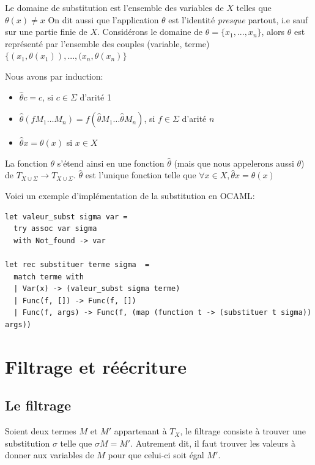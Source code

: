 \documentclass[11pt]{book}
\begin{document}
Le domaine de substitution est l'ensemble des variables de $X$ telles que $\theta (x) \neq x$
On dit aussi que l'application $\theta$ est l'identité \textit{presque} partout, i.e sauf sur une partie finie
de $X$.
Considérons le domaine de $\theta = \{x_1, ..., x_n\}$, alors $\theta$ est représenté par l'ensemble
des couples (variable, terme) $\{(x_1, \theta (x_1)), ...,(x_n, \theta (x_n) \} $

Nous avons par induction:
\begin{itemize}
	\item $\hat{\theta} c = c$, si $c \in \Sigma$ d'arité 1
	\item $\hat{\theta} (f M_1 \dots M_n) = f(\hat{\theta} M_1 \dots \hat{\theta} M_n )$, si $f \in \Sigma$ d'arité $n$ 
	\item $\hat{\theta} x = \theta (x)$ si $x \in X$
\end{itemize}
La fonction  $\theta$ s'étend ainsi en une fonction $\hat{\theta}$ (mais que nous appelerons aussi $\theta$)
 de  $T_{X \cup \Sigma} \rightarrow T_{X \cup \Sigma} $.
$\hat{\theta}$ est l'unique fonction telle que $\forall x \in X, \hat{\theta}x = \theta (x)$
\begin{center}
\end{center}

Voici un exemple d'implémentation de la substitution en OCAML:
\begin{Verbatim}
let valeur_subst sigma var =
  try assoc var sigma
  with Not_found -> var

let rec substituer terme sigma  =
  match terme with
  | Var(x) -> (valeur_subst sigma terme)
  | Func(f, []) -> Func(f, []) 
  | Func(f, args) -> Func(f, (map (function t -> (substituer t sigma)) args))
\end{Verbatim}

\section{Filtrage et réécriture}
\subsection{Le filtrage}
Soient deux termes $M$ et $M'$ appartenant à $T_X$, le filtrage consiste à trouver une substitution $\sigma$
telle que $\sigma M = M'$. Autrement dit, il faut trouver les valeurs à donner aux variables de $M$ pour que celui-ci
soit égal $M'$.
\end{document}
